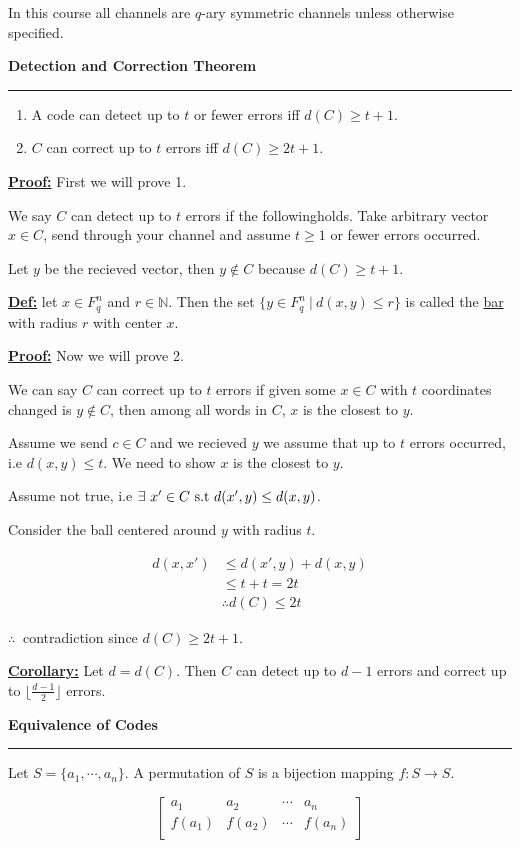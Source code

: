 \documentclass{article}
\newcommand{\header}[1]{
	\begin{Large}
	\noindent\textbf{#1}
	\vspace{2pt}
	\hrule
	\vspace{16pt}
	\end{Large}
	\normalsize
}
\renewcommand{\b}[1]{\textbf{#1}}
\newcommand{\ul}[1]{\underline{#1}}
\renewcommand{\aligned}[1]{
	\begin{align*}
		#1
	\end{align*}
}
\newcommand{\newdef}[2]{\b{\ul{#1:}} #2}
\renewcommand{\iff}{\textnormal{ iff }}
\newcommand{\st}{\textnormal{ s.t }}
\begin{document}
In this course all channels are $q$-ary symmetric channels unless otherwise
specified.

\header{Detection and Correction Theorem}

\begin{enumerate}
	\item A code can detect up to $t$ or fewer errors\iff
	      $d(C) \geq t + 1$.
	\item $C$ can correct up to $t$ errors\iff $d(C) \geq 2t+1$.
\end{enumerate}

\newdef{Proof}{
	First we will prove 1.

	We say $C$ can detect up to $t$ errors if the followingholds. Take
	arbitrary vector $x \in C$, send through your channel and assume
	$t \geq 1$ or fewer errors occurred.

	Let $y$ be the recieved vector, then $y \notin C$ because
	$d(C) \geq t+1$.
}

\newdef{Def}{
	let $x \in F_q^n$ and $r \in \mathbb{N}$. Then the set
	$\{y \in F_q^n\ |\ d(x, y) \leq r\}$ is called the \ul{bar} with radius
	$r$ with center $x$.
}

\newdef{Proof}{
	Now we will prove 2.

	We can say $C$ can correct up to $t$ errors if given some $x \in C$
	with $t$ coordinates changed is $y \notin C$, then among all words in
	$C$,  $x$ is the closest to $y$.

	Assume we send $c \in C$ and we recieved $y$ we assume that up to $t$
	errors occurred, i.e $d(x, y) \leq t$. We need to show $x$ is the
	closest to $y$.

	Assume not true, i.e $\exists\ x' \in C \st d(x', y) \leq d(x, y)$.

	Consider the ball centered around $y$ with radius $t$.
	\aligned{
		d(x, x') & \leq d(x', y) + d(x, y) \\
		         & \leq t + t = 2t         \\
		         & \therefore d(C) \leq 2t
	}
	$\therefore\ $ contradiction since $d(C) \geq 2t + 1$.
}

\newdef{Corollary}{
	Let $d = d(C)$. Then $C$ can detect up to $d-1$ errors and correct up
	to $\lfloor\frac{d-1}{2}\rfloor$ errors.
}

\header{Equivalence of Codes}

Let $S = \{ a_1, \cdots, a_n \}$. A permutation of $S$ is a bijection mapping
$f: S \rightarrow S$.

\[
	\begin{bmatrix}
		a_1    & a_2    & \cdots & a_n    \\
		f(a_1) & f(a_2) & \cdots & f(a_n) \\
	\end{bmatrix}
\]
\end{document}
